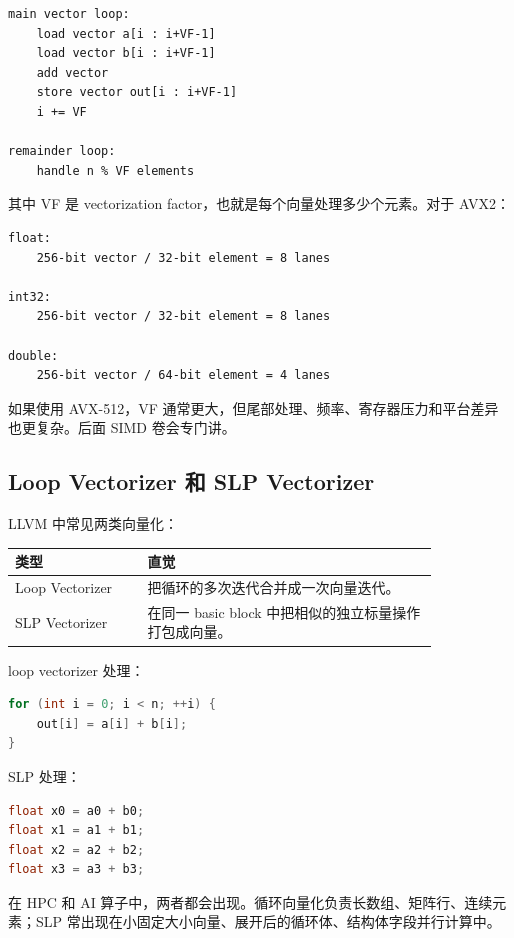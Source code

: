 \begin{lstlisting}
main vector loop:
    load vector a[i : i+VF-1]
    load vector b[i : i+VF-1]
    add vector
    store vector out[i : i+VF-1]
    i += VF

remainder loop:
    handle n % VF elements
\end{lstlisting}

其中 VF 是 vectorization factor，也就是每个向量处理多少个元素。对于 AVX2：

\begin{lstlisting}
float:
    256-bit vector / 32-bit element = 8 lanes

int32:
    256-bit vector / 32-bit element = 8 lanes

double:
    256-bit vector / 64-bit element = 4 lanes
\end{lstlisting}

如果使用 AVX-512，VF 通常更大，但尾部处理、频率、寄存器压力和平台差异也更复杂。后面 SIMD 卷会专门讲。

\subsection{Loop Vectorizer 和 SLP Vectorizer}

LLVM 中常见两类向量化：

\begin{center}
\begin{tabular}{L{0.26\linewidth}L{0.58\linewidth}}
\toprule
类型 & 直觉 \\
\midrule
Loop Vectorizer & 把循环的多次迭代合并成一次向量迭代。 \\
SLP Vectorizer & 在同一 basic block 中把相似的独立标量操作打包成向量。 \\
\bottomrule
\end{tabular}
\end{center}

loop vectorizer 处理：

\begin{lstlisting}[language=C++]
for (int i = 0; i < n; ++i) {
    out[i] = a[i] + b[i];
}
\end{lstlisting}

SLP 处理：

\begin{lstlisting}[language=C++]
float x0 = a0 + b0;
float x1 = a1 + b1;
float x2 = a2 + b2;
float x3 = a3 + b3;
\end{lstlisting}

在 HPC 和 AI 算子中，两者都会出现。循环向量化负责长数组、矩阵行、连续元素；SLP 常出现在小固定大小向量、展开后的循环体、结构体字段并行计算中。

